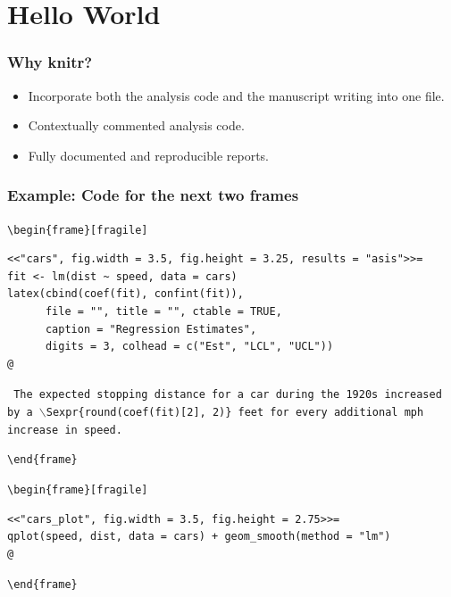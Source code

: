 \documentclass[t]{beamer}\usepackage[]{graphicx}\usepackage[]{color}
\begin{document}

\section{Hello World}
\begin{frame}
  \frametitle{Why knitr?}
  \begin{itemize}
    \item Incorporate both the analysis code and the manuscript writing into one
      file.
    \item Contextually commented analysis code.
    \item Fully documented and reproducible reports.
  \end{itemize}
\end{frame}

\begin{frame}[fragile]
  \frametitle{Example: Code for the next two frames}
 
  \footnotesize
\verb;\begin{frame}[fragile];
\begin{verbatim}<<"cars", fig.width = 3.5, fig.height = 3.25, results = "asis">>=
fit <- lm(dist ~ speed, data = cars) 
latex(cbind(coef(fit), confint(fit)), 
      file = "", title = "", ctable = TRUE, 
      caption = "Regression Estimates", 
      digits = 3, colhead = c("Est", "LCL", "UCL"))
@ 
\end{verbatim}

{\tt 
The expected stopping distance for a car during the 1920s 
increased by a $\backslash$Sexpr\{round(coef(fit)[2], 2)\} 
feet for every additional mph increase in speed.} 

\verb;\end{frame};

\verb;\begin{frame}[fragile];
  \begin{verbatim}<<"cars_plot", fig.width = 3.5, fig.height = 2.75>>=
qplot(speed, dist, data = cars) + geom_smooth(method = "lm")
@
\end{verbatim}
\verb;\end{frame};
\end{frame}
\end{document}
